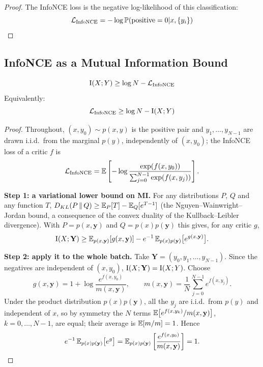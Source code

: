 \begin{notechapter}
\begin{proof}
The InfoNCE loss is the negative log-likelihood of this classification:
\begin{equation}
\mathcal{L}_{\text{InfoNCE}} = -\log \mathbb{P}(\text{positive} = 0 | x, \{y_i\})
\end{equation}
\end{proof}

\subsection{InfoNCE as a Mutual Information Bound}

\begin{theorem}
\label{contrastive-rigorous:thm:infonce_mi}
\begin{equation}
\mathrm{I}(X; Y) \geq \log N - \mathcal{L}_{\text{InfoNCE}}
\end{equation}
Equivalently:
\begin{equation}
\mathcal{L}_{\text{InfoNCE}} \geq \log N - \mathrm{I}(X; Y)
\end{equation}
\end{theorem}

\begin{proof}
Throughout, $(x, y_0) \sim p(x,y)$ is the positive pair and $y_1, \dots, y_{N-1}$ are drawn i.i.d.\ from the
marginal $p(y)$, independently of $(x, y_0)$; the InfoNCE loss of a critic $f$ is
\begin{equation}
\mathcal{L}_{\text{InfoNCE}} = \mathbb{E}\left[-\log \frac{\exp(f(x, y_0))}{\sum_{j=0}^{N-1} \exp(f(x, y_j))}\right].
\end{equation}

\textbf{Step 1: a variational lower bound on MI.} For any distributions $P$, $Q$ and any function $T$,
$D_{KL}(P \,\|\, Q) \geq \mathbb{E}_P[T] - \mathbb{E}_Q[e^{T-1}]$ (the Nguyen--Wainwright--Jordan bound, a consequence of the convex duality of the Kullback--Leibler divergence).
With $P = p(x,\mathbf{y})$ and $Q = p(x)p(\mathbf{y})$ this gives, for any critic $g$,
\begin{equation}
\label{contrastive-rigorous:eq:nwj}
\mathrm{I}(X; \mathbf{Y}) \geq \mathbb{E}_{p(x,\mathbf{y})}[g(x,\mathbf{y})] - e^{-1}\,\mathbb{E}_{p(x)p(\mathbf{y})}\big[e^{g(x,\mathbf{y})}\big].
\end{equation}

\textbf{Step 2: apply it to the whole batch.} Take $\mathbf{Y} = (y_0, y_1, \dots, y_{N-1})$. Since the negatives
are independent of $(x, y_0)$, $\mathrm{I}(X; \mathbf{Y}) = \mathrm{I}(X; Y)$. Choose
\[
g(x, \mathbf{y}) = 1 + \log \frac{e^{f(x, y_0)}}{m(x, \mathbf{y})},
\qquad m(x, \mathbf{y}) = \frac{1}{N}\sum_{j=0}^{N-1} e^{f(x, y_j)} .
\]
Under the product distribution $p(x)p(\mathbf{y})$, all the $y_j$ are i.i.d.\ from $p(y)$ and independent of
$x$, so by symmetry the $N$ terms $\mathbb{E}\big[e^{f(x, y_k)}/m(x,\mathbf{y})\big]$, $k = 0,\dots,N-1$, are equal; their
average is $\mathbb{E}[m/m] = 1$. Hence
\[
e^{-1}\,\mathbb{E}_{p(x)p(\mathbf{y})}\big[e^{g}\big] = \mathbb{E}_{p(x)p(\mathbf{y})}\left[\frac{e^{f(x, y_0)}}{m(x, \mathbf{y})}\right] = 1 .
\]


\end{proof}
\end{notechapter}
